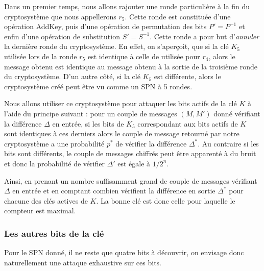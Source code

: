 \documentclass[a4paper,11pt]{article}
\begin{document}
Dans un premier temps, nous allons rajouter une ronde particulière à la fin du cryptosystème que
nous appellerons $r_5$. Cette ronde est constituée d'une opération AddKey, puis d'une opération
de permutation des bits $P' = P^{-1}$ et enfin d'une opération de substitution $S' = S^{-1}$. Cette
ronde a pour but d'\emph{annuler} la dernière ronde du cryptosystème. En effet, on s'aperçoit, que
si la clé $K_5$ utilisée lors de la ronde $r_5$ est identique à celle de utilisée pour $r_4$, alors
le message obtenu est identique au message obtenu à la sortie de la troisième ronde du
cryptosystème. D'un autre côté, si la clé $K_5$ est différente, alors le cryptosystème créé peut
être vu comme un SPN à 5 rondes.

Nous allons utiliser ce cryptosystème pour attaquer les bits actifs de la clé $K$ à l'aide du
principe suivant : pour un couple de messages $(M,M')$ donné vérifiant la différence $\Delta$ en
entrée, si les bits de $K_5$ correspondant aux bits actifs de $K$ sont identiques à ces derniers
alors le couple de message retourné par notre cryptosystème a une probabilité $p^*$ de vérifier la
différence $\Delta^*$. Au contraire si les bits sont différents, le couple de messages chiffrés peut
être apparenté à du bruit et donc la probabilité de vérifier $\Delta'$ est égale à $1/2^n$.

Ainsi, en prenant un nombre suffisamment grand de couple de messages vérifiant $\Delta$ en entrée et
en comptant combien vérifient la différence en sortie $\Delta^*$ pour chacune des clés actives de
$K$. La bonne clé est donc celle pour laquelle le compteur est maximal.

\subsubsection*{Les autres bits de la clé}

Pour le SPN donné, il ne reste que quatre bits à découvrir, on envisage donc naturellement une
attaque exhaustive sur ces bits.

%
\end{document}
